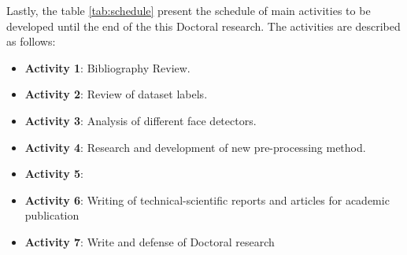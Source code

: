 

Lastly, the table \autoref{tab:schedule} present the schedule of main activities to be developed until the end of the this Doctoral research. The activities are described as follows:

\begin{itemize}
\item \textbf{Activity 1}: Bibliography Review.
\item \textbf{Activity 2}: Review of dataset labels.
\item \textbf{Activity 3}: Analysis of different face detectors.
\item \textbf{Activity 4}: Research and development of new pre-processing method.
\item \textbf{Activity 5}: 
\item \textbf{Activity 6}: Writing of technical-scientific reports and articles for academic publication
\item \textbf{Activity 7}: Write and defense of Doctoral research
\end{itemize}
